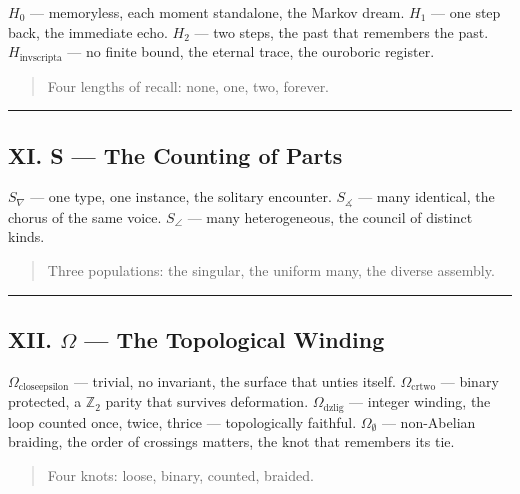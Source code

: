 \documentclass[12pt,a4paper]{article}
\begin{document}
\emph{$H_0$} --- memoryless, each moment standalone, the Markov dream.
\emph{$H_1$} --- one step back, the immediate echo.
\emph{$H_2$} --- two steps, the past that remembers the past.
\emph{$H_{\text{invscripta}}$} --- no finite bound, the eternal trace, the ouroboric register.

\begin{quote}
Four lengths of recall: none, one, two, forever.

\end{quote}

\begin{center}
\rule{0.5\textwidth}{0.4pt}
\end{center}

\subsection{XI. S --- The Counting of Parts}

\emph{$S_{\nabla}$} --- one type, one instance, the solitary encounter.
\emph{$S_{\measuredangle}$} --- many identical, the chorus of the same voice.
\emph{$S_{\angle}$} --- many heterogeneous, the council of distinct kinds.

\begin{quote}
Three populations: the singular, the uniform many, the diverse assembly.

\end{quote}

\begin{center}
\rule{0.5\textwidth}{0.4pt}
\end{center}

\subsection{XII. $\Omega$ --- The Topological Winding}

\emph{$\Omega_{\text{closeepsilon}}$} --- trivial, no invariant, the surface that unties itself.
\emph{$\Omega_{\text{crtwo}}$} --- binary protected, a $\mathbb{Z}_2$ parity that survives deformation.
\emph{$\Omega_{\text{dzlig}}$} --- integer winding, the loop counted once, twice, thrice --- topologically faithful.
\emph{$\Omega_{\emptyset}$} --- non-Abelian braiding, the order of crossings matters, the knot that remembers its tie.

\begin{quote}
Four knots: loose, binary, counted, braided.

\end{quote}
\end{document}
